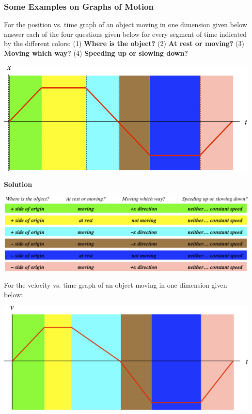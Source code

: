 \documentclass[12pt,addpoints]{exam}
\begin{document}
	\begin{center}
		\subsubsection*{Some Examples on Graphs of Motion}
	\end{center}
	\begin{questions}
		\question For the position vs. time graph of an object moving in one dimension given below answer each of the four questions given below for every segment of time indicated by the different colors: (1) \textbf{Where is the object?} (2) \textbf{At rest or moving?} (3) \textbf{Moving which way?} (4) \textbf{Speeding up or slowing down?}
		\begin{center}
			\includegraphics[scale=0.85]{ex1.png}
		\end{center}
		\textbf{Solution}
		\begin{center}
			\includegraphics[scale=0.75]{sol1.png}
		\end{center}	
		\question For the velocity vs. time graph of an object moving in one dimension given below:
		\begin{center}
			\includegraphics[scale=0.85]{ex2.png}

\end{center}
\end{questions}
\end{document}
